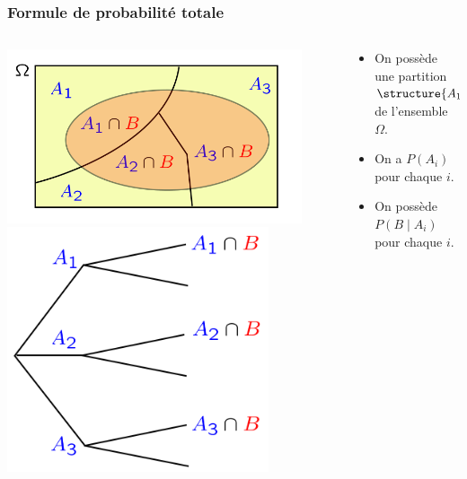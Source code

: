 \documentclass{beamer}
\begin{document}
\begin{frame}[t]
    \frametitle{Formule de probabilité totale}
   \begin{columns}
       \begin{column}{0.4\textwidth}
           {
                   \centering
                   \includegraphics[width=0.9\textwidth]{./form_total_probablity.png}
               }
        {
                \centering
                \includegraphics[width=0.8\textwidth]{./total_probability_tree.png}
        }
       \end{column}
       \begin{column}{0.6\textwidth}
           \begin{itemize}
               \scriptsize
               \item<1-> On possède une partition $\structure{A_1,A_2,A_3}$ de
                   l'ensemble $\Omega$. \\[8pt]
               \item<1-> On a $P(A_i)$ pour chaque $i$. 
               \item<3-> On possède $P(B \;|\; A_i)$ pour chaque $i$.
           \end{itemize}


\end{column}
\end{columns}
\end{frame}
\end{document}
